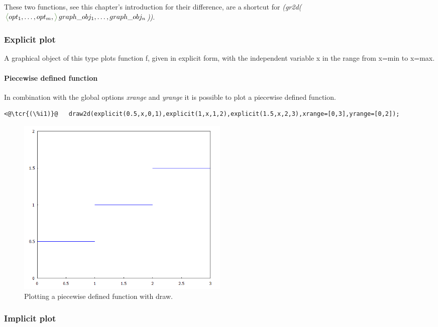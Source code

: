 \documentclass[../Maxima_Workbook.tex]{subfiles}
\begin{document}
\lz These two functions, see this chapter's introduction for their difference, are a shortcut for \emph{(gr2d($ \glangle opt_1,\dots,opt_m, \grangle \, graph\_obj_1,\dots,graph\_obj_n $))}.

\subsubsection{Explicit plot}

\lz {}\hfill {}

\lz A graphical object of this type plots function f, given in explicit form, with the independent variable x in the range from x=min to x=max. 

\paragraph{Piecewise defined function} \mbox{}

\lz In combination with the global options \emph{xrange} and \emph{yrange} it is possible to plot a piecewise defined function.

\lz \begin{lstlisting}
<@\tcr{(\%i1)}@   draw2d(explicit(0.5,x,0,1),explicit(1,x,1,2),explicit(1.5,x,2,3),xrange=[0,3],yrange=[0,2]);
\end{lstlisting}

\begin{figure}
	\centering
	\includegraphics[width=0.5\textwidth]{Pl_draw_piecewise.png}
	\caption{Plotting a piecewise defined function with draw.}
	\label{Pl-Fig11}
\end{figure}

\subsubsection{Implicit plot}
\end{document}
